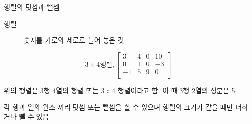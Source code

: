 \documentclass[10pt,t]{beamer}
\begin{document}
\begin{frame}{행렬의 덧셈과 뺄셈}
    \begin{description}
        \item[행렬] 숫자를 가로와 세로로 늘어 놓은 것 
    \end{description}

    \[ 3 \times 4 \text{행렬}, 
    \begin{bmatrix}
        3 & 4 & 0 & 10 \\
        0 & 1 & 0 & -3 \\
        -1 & 5 & 9 & 0 \\
    \end{bmatrix}
    \]

    위의 행렬은 3행 4열의 행렬 또는 $3\times 4$ 행렬이라고 함. 이 때 3행 2열의 성분은 5

    각 행과 열의 원소 끼리 덧셈 또는 뺄셈을 할 수 있으며 행렬의 크기가 같을 때만 더하거나 뺄 수 있음
\end{frame}
\end{document}
